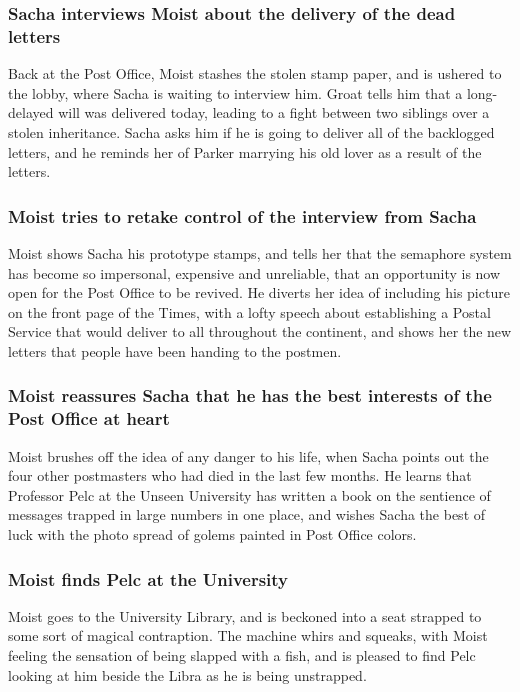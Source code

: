 \subsubsection{\Gls{Sacha} interviews \Gls{Moist} about the delivery of the dead letters}
Back at the Post Office, \Gls{Moist} stashes the stolen stamp paper, and is ushered to the lobby,
where \Gls{Sacha} is waiting to interview him. \Gls{Groat} tells him that a long-delayed will was
delivered today, leading to a fight between two siblings over a stolen inheritance. \Gls{Sacha}
asks him if he is going to deliver all of the backlogged letters, and he reminds her of \Gls{Parker}
marrying his old lover as a result of the letters.

\subsubsection{\Gls{Moist} tries to retake control of the interview from \Gls{Sacha}}
\Gls{Moist} shows \Gls{Sacha} his prototype stamps, and tells her that the semaphore system has
become so impersonal, expensive and unreliable, that an opportunity is now open for the Post Office
to be revived. He diverts her idea of including his picture on the front page of the Times, with
a lofty speech about establishing a Postal Service that would deliver to all throughout the
continent, and shows her the new letters that people have been handing to the postmen.

\subsubsection{\Gls{Moist} reassures \Gls{Sacha} that he has the best interests of the Post Office
    at heart}
\Gls{Moist} brushes off the idea of any danger to his life, when \Gls{Sacha} points out the four
other postmasters who had died in the last few months. He learns that Professor \Gls{Pelc} at the
Unseen University has written a book on the sentience of messages trapped in large numbers in one
place, and wishes \Gls{Sacha} the best of luck with the photo spread of golems painted in Post
Office colors.

\subsubsection{\Gls{Moist} finds \Gls{Pelc} at the University}
\Gls{Moist} goes to the University Library, and is beckoned into a seat strapped to some sort of
magical contraption. The machine whirs and squeaks, with \Gls{Moist} feeling the sensation of being
slapped with a fish, and is pleased to find \Gls{Pelc} looking at him beside the \Gls{Libra} as he
is being unstrapped.

